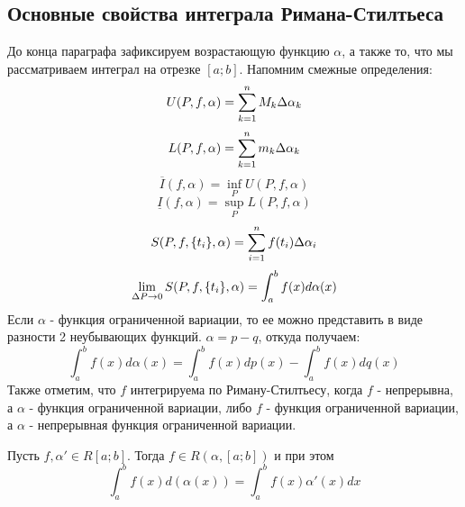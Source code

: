 \subsection{Основные свойства интеграла Римана-Стилтьеса}

\begin{note}
	До конца параграфа зафиксируем возрастающую функцию $\alpha$, а также то, что мы рассматриваем интеграл на отрезке $[a; b]$. Напомним смежные определения:
	\[
		U(P, f, \alpha) = \sum\limits_{k = 1}^nM_k\Delta \alpha_k
	\]
	\[
		L(P, f, \alpha) = \sum\limits_{k = 1}^nm_k\Delta \alpha_k
	\]
	\[
		\overline{I}(f, \alpha) = \inf_P U(P, f, \alpha)
	\]
	\[
		\underline{I}(f, \alpha) = \sup_P L(P, f, \alpha)
	\]
	\[
		S(P, f, \{t_i\}, \alpha) = \sum\limits_{i= 1}^nf(t_i)\Delta\alpha_i
	\]
	\[
		\lim\limits_{\Delta P \to 0}S(P, f, \{t_i\}, \alpha) = \int_a^bf(x)d\alpha(x)
	\]
	Если $\alpha$ - функция ограниченной вариации, то ее можно представить в виде разности 2 неубывающих функций. $\alpha = p - q$, откуда получаем:
	\[
		\int_a^bf(x)d\alpha(x) = \int_a^bf(x)dp(x) - \int_a^bf(x)dq(x)
	\]
	Также отметим, что $f$ интегрируема по Риману-Стилтьесу, когда $f$ - непрерывна, а $\alpha$ - функция ограниченной вариации, либо $f$ - функция ограниченной вариации, а $\alpha$ - непрерывная функция ограниченной вариации. 
\end{note}

\begin{theorem}
	Пусть $f, \alpha' \in R[a; b]$. Тогда $f \in R(\alpha, [a; b])$ и при этом
	\[
		\int_a^b f(x) d(\alpha(x)) = \int_a^b f(x) \alpha'(x) dx
	\]
\end{theorem}

